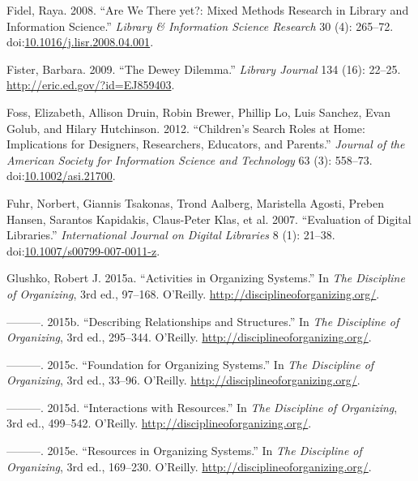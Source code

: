 \documentclass[]{article}
\begin{document}
\hypertarget{ref-fidelux5fareux5f2008}{}
Fidel, Raya. 2008. ``Are We There yet?: Mixed Methods Research in
Library and Information Science.'' \emph{Library \& Information Science
Research} 30 (4): 265--72.
doi:\href{https://doi.org/10.1016/j.lisr.2008.04.001}{10.1016/j.lisr.2008.04.001}.

\hypertarget{ref-fisterux5fdeweyux5f2009}{}
Fister, Barbara. 2009. ``The Dewey Dilemma.'' \emph{Library Journal} 134
(16): 22--25. \url{http://eric.ed.gov/?id=EJ859403}.

\hypertarget{ref-fossux5fchildrensux5f2012}{}
Foss, Elizabeth, Allison Druin, Robin Brewer, Phillip Lo, Luis Sanchez,
Evan Golub, and Hilary Hutchinson. 2012. ``Children's Search Roles at
Home: Implications for Designers, Researchers, Educators, and Parents.''
\emph{Journal of the American Society for Information Science and
Technology} 63 (3): 558--73.
doi:\href{https://doi.org/10.1002/asi.21700}{10.1002/asi.21700}.

\hypertarget{ref-fuhrux5fevaluationux5f2007}{}
Fuhr, Norbert, Giannis Tsakonas, Trond Aalberg, Maristella Agosti,
Preben Hansen, Sarantos Kapidakis, Claus-Peter Klas, et al. 2007.
``Evaluation of Digital Libraries.'' \emph{International Journal on
Digital Libraries} 8 (1): 21--38.
doi:\href{https://doi.org/10.1007/s00799-007-0011-z}{10.1007/s00799-007-0011-z}.

\hypertarget{ref-glushkoux5factivitiesux5f2015}{}
Glushko, Robert J. 2015a. ``Activities in Organizing Systems.'' In
\emph{The Discipline of Organizing}, 3rd ed., 97--168. O'Reilly.
\url{http://disciplineoforganizing.org/}.

\hypertarget{ref-glushkoux5fdescribingux5f2015}{}
---------. 2015b. ``Describing Relationships and Structures.'' In
\emph{The Discipline of Organizing}, 3rd ed., 295--344. O'Reilly.
\url{http://disciplineoforganizing.org/}.

\hypertarget{ref-glushkoux5ffoundationux5f2015}{}
---------. 2015c. ``Foundation for Organizing Systems.'' In \emph{The
Discipline of Organizing}, 3rd ed., 33--96. O'Reilly.
\url{http://disciplineoforganizing.org/}.

\hypertarget{ref-glushkoux5finteractionsux5f2015}{}
---------. 2015d. ``Interactions with Resources.'' In \emph{The
Discipline of Organizing}, 3rd ed., 499--542. O'Reilly.
\url{http://disciplineoforganizing.org/}.

\hypertarget{ref-glushkoux5fresourcesux5f2015}{}
---------. 2015e. ``Resources in Organizing Systems.'' In \emph{The
Discipline of Organizing}, 3rd ed., 169--230. O'Reilly.
\url{http://disciplineoforganizing.org/}.
\end{document}
